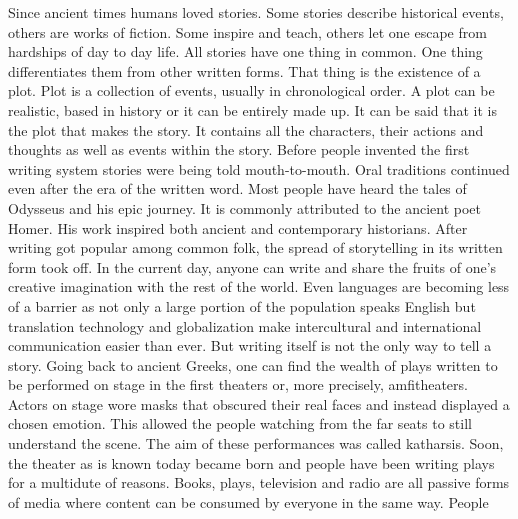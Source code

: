 \label{chapter:introduction}
Since ancient times humans loved stories.
Some stories describe historical events, others are works of fiction.
Some inspire and teach, others let one escape from hardships of day to day life.
All stories have one thing in common.
One thing differentiates them from other written forms.
That thing is the existence of a plot.
Plot is a collection of events, usually in chronological order.
A plot can be realistic, based in history or it can be entirely made up.
It can be said that it is the plot that makes the story.
It contains all the characters, their actions and thoughts as well as events within the story.
Before people invented the first writing system stories were being told mouth-to-mouth.
Oral traditions continued even after the era of the written word.
Most people have heard the tales of Odysseus and his epic journey.
It is commonly attributed to the ancient poet Homer.
His work inspired both ancient and contemporary historians\cite{marincola2007odysseus}.
After writing got popular among common folk, the spread of storytelling in its written form took off.
In the current day, anyone can write and share the fruits of one's creative imagination with the rest of the world.
Even languages are becoming less of a barrier as not only a large portion of the population speaks English but translation technology and globalization make intercultural and international communication easier than ever\cite{coulmas1987speak}.
But writing itself is not the only way to tell a story.
Going back to ancient Greeks, one can find the wealth of plays written to be performed on stage in the first theaters or, more precisely, amfitheaters.
Actors on stage wore masks that obscured their real faces and instead displayed a chosen emotion.
This allowed the people watching from the far seats to still understand the scene.
The aim of these performances was called katharsis\cite{hart2010art}.
Soon, the theater as is known today became born and people have been writing plays for a multidute of reasons.
Books, plays, television and radio are all passive forms of media where content can be consumed by everyone in the same way.
People
